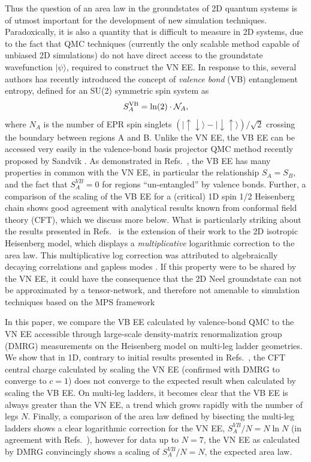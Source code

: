 \documentclass[prl,aps,twocolumn,floatfix,amsmath,amssymb,superscriptaddress,tightenlines]{revtex4}
\begin{document}
Thus the question of an area law in the groundstates of 2D quantum systems is of utmost important for the development of new simulation techniques.  Paradoxically, it is also a quantity that is difficult to measure in 2D systems, due to the fact that QMC techniques (currently the only scalable method capable of unbiased 2D simulations) do not have direct access to the groundstate wavefunction $| \psi \rangle$, required to construct the VN EE.  In response to this, several authors \cite{Alet, Chh} has recently introduced the concept of {\it valence bond} (VB) entanglement entropy, defined for an SU(2) symmetric spin system as
\begin{equation}
S^{\rm VB}_A = \ln(2) \cdot \mathcal{N}_A,
\end{equation}
where $N_A$ is the number of EPR spin singlets ${( |\uparrow \downarrow \rangle - | \downarrow \uparrow \rangle)/\sqrt{2}}$ crossing the boundary between regions A and B.  Unlike the VN EE, the VB EE can be accessed very easily in the valence-bond basis projector QMC method recently proposed by Sandvik \cite{Sandvik}.  
As demonstrated in Refs.~\cite{Alet,Chh}, the VB EE has many properties in common with the VN EE, in particular the relationship $S_A = S_B$, and the fact that $S^{VB}_A=0$ for regions ``un-entangled'' by valence bonds.  Further, a comparison of the scaling of the VB EE for a (critical) 1D spin 1/2 Heisenberg chain shows good agreement with analytical results known from conformal field theory (CFT), which we discuss more below.
What is particularly striking about the results presented in Refs.~\cite{Alet,Chh} is the extension of their work to the 2D isotropic Heisenberg model, which displays a {\it multiplicative} logarithmic correction to the area law.  This multiplicative log correction was attributed to algebraically decaying correlations \cite{Chh} and gapless modes \cite{Alet}.
 If this property were to be shared by the VN EE, it could have the consequence that the 2D Neel groundstate can not be approximated by a tensor-network, and therefore not amenable to simulation techniques based on the MPS framework
 
In this paper, we compare the VB EE calculated by valence-bond QMC to the VN EE accessible through large-scale density-matrix renormalization group (DMRG) measurements on the Heisenberg model on multi-leg ladder geometries.    We show that in 1D, contrary to initial results presented in Refs.~\cite{Alet,Chh}, the CFT central charge calculated by scaling the VN EE (confirmed with DMRG to converge to $c=1$) does not converge to the expected result when calculated by scaling the VB EE.  On multi-leg ladders, it becomes clear that the VB EE is always greater than the VN EE, a trend which grows rapidly with the number of legs $N$.  Finally, a comparison of the area law defined by bisecting the multi-leg ladders shows a clear logarithmic correction for the VN EE, $S^{VB}_A /N = N \ln N$ (in agreement with Refs.~\cite{Alet,Chh}), however for data up to $N=7$, the VN EE as calculated by DMRG convincingly shows a scaling of $S^{VB}_A /N = N$, the expected area law.
\end{document}
